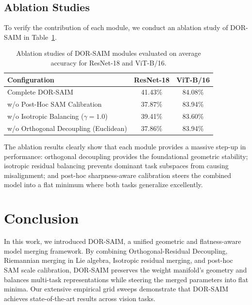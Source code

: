 \documentclass{article}
\begin{document}
\subsection{Ablation Studies}
To verify the contribution of each module, we conduct an ablation study of DOR-SAIM in Table~\ref{tab:ablation}.
\begin{table}[ht]
\caption{Ablation studies of DOR-SAIM modules evaluated on average accuracy for ResNet-18 and ViT-B/16.}
\label{tab:ablation}
\vskip 0.15in
\begin{center}
\begin{small}
\begin{tabular} {lcc}
\toprule
\textbf{Configuration} & \textbf{ResNet-18} & \textbf{ViT-B/16} \\
\midrule
Complete DOR-SAIM & 41.43\% & 84.08\% \\
w/o Post-Hoc SAM Calibration & 37.87\% & 83.94\% \\
w/o Isotropic Balancing ($\gamma = 1.0$) & 39.41\% & 83.60\% \\
w/o Orthogonal Decoupling (Euclidean) & 37.86\% & 83.94\% \\
\bottomrule
\end{tabular}
\end{small}
\end{center}
\vskip -0.1in
\end{table}

The ablation results clearly show that each module provides a massive step-up in performance: orthogonal decoupling provides the foundational geometric stability; isotropic residual balancing prevents dominant task subspaces from causing misalignment; and post-hoc sharpness-aware calibration steers the combined model into a flat minimum where both tasks generalize excellently.

\section{Conclusion}
\label{sec:conclusion}
In this work, we introduced DOR-SAIM, a unified geometric and flatness-aware model merging framework. By combining Orthogonal-Residual Decoupling, Riemannian merging in Lie algebra, Isotropic residual merging, and post-hoc SAM scale calibration, DOR-SAIM preserves the weight manifold's geometry and balances multi-task representations while steering the merged parameters into flat minima. Our extensive empirical grid sweeps demonstrate that DOR-SAIM achieves state-of-the-art results across vision tasks.

\nocite{*}


\end{document}
